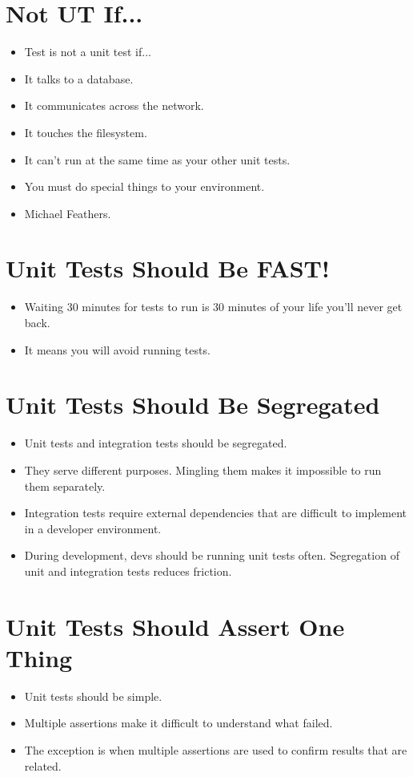 \documentclass{article}
\begin{document}
\newpage
\section{Not UT If...}
\begin{itemize}
    \item Test is not a unit test if...
    \item It talks to a database.
    \item It communicates across the network.
    \item It touches the filesystem.
    \item It can't run at the same time as your other unit tests.
    \item You must do special things to your environment.
    \item Michael Feathers.
\end{itemize}

\newpage
\section{Unit Tests Should Be FAST!}
\begin{itemize}
    \item Waiting 30 minutes for tests to run is 30 minutes of your life you'll
        never get back.
    \item It means you will avoid running tests.
\end{itemize}

\newpage
\section{Unit Tests Should Be Segregated}
\begin{itemize}
    \item Unit tests and integration tests should be segregated.
    \item They serve different purposes. Mingling them makes it impossible to
        run them separately.
    \item Integration tests require external dependencies that are difficult to
        implement in a developer environment.
    \item During development, devs should be running unit tests often. Segregation
        of unit and integration tests reduces friction.
\end{itemize}

\newpage
\section{Unit Tests Should Assert One Thing}
\begin{itemize}
    \item Unit tests should be simple.
    \item Multiple assertions make it difficult to understand what failed.
    \item The exception is when multiple assertions are used to confirm results
        that are related.
\end{itemize}
\end{document}
